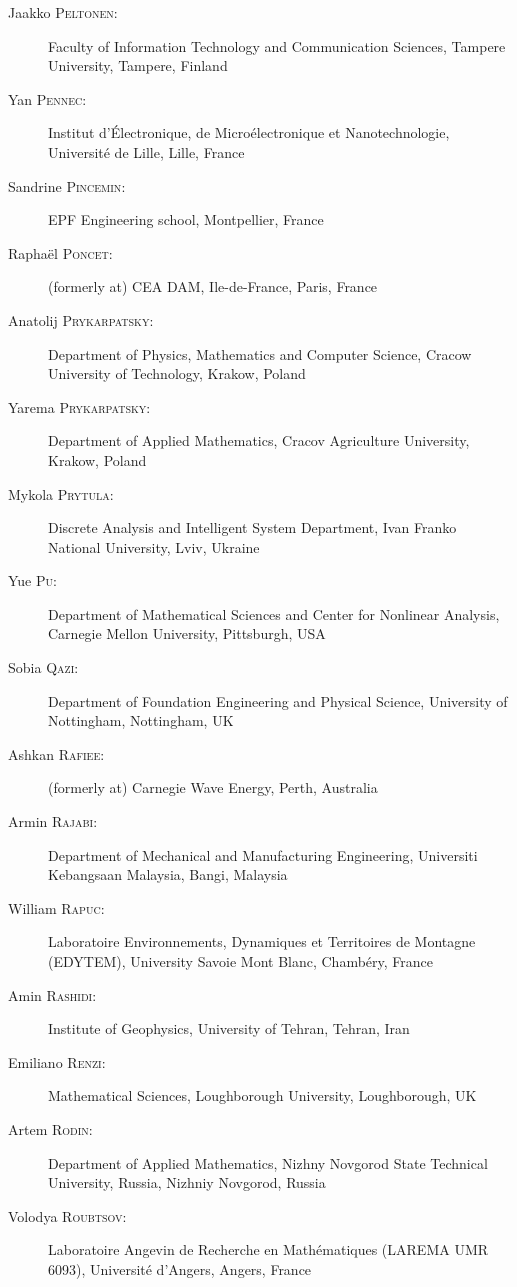 \documentclass[final, a4paper, oneside, 12pt]{article}
\numberwithin{equation}{section}
\begin{document}
\begin{description}
  \item[Jaakko \textsc{Peltonen}:] Faculty of Information Technology and Communication Sciences, Tampere University, Tampere, Finland
  \item[Yan \textsc{Pennec}:] Institut d'\'Electronique, de Micro\'electronique et Nanotechnologie, Universit\'e de Lille, Lille, France
  \item[Sandrine \textsc{Pincemin}:] EPF Engineering school, Montpellier, France
  \item[Rapha\"el \textsc{Poncet}:] (formerly at) CEA DAM, Ile-de-France, Paris, France
  \item[Anatolij \textsc{Prykarpatsky}:] Department of Physics, Mathematics and Computer Science, Cracow University of Technology, Krakow, Poland
  \item[Yarema \textsc{Prykarpatsky}:] Department of Applied Mathematics, Cracov Agriculture University, Krakow, Poland
  \item[Mykola \textsc{Prytula}:] Discrete Analysis and Intelligent System Department, Ivan Franko National University, Lviv, Ukraine
  \item[Yue \textsc{Pu}:] Department of Mathematical Sciences and Center for Nonlinear Analysis, Carnegie Mellon University, Pittsburgh, USA
  \item[Sobia \textsc{Qazi}:] Department of Foundation Engineering and Physical Science, University of Nottingham, Nottingham, UK
  \item[Ashkan \textsc{Rafiee}:] (formerly at) Carnegie Wave Energy, Perth, Australia
  \item[Armin \textsc{Rajabi}:] Department of Mechanical and Manufacturing Engineering, Universiti Kebangsaan Malaysia, Bangi, Malaysia
  \item[William \textsc{Rapuc}:] Laboratoire Environnements, Dynamiques et Territoires de Montagne (EDYTEM), University Savoie Mont Blanc, Chamb\'ery, France
  \item[Amin \textsc{Rashidi}:] Institute of Geophysics, University of Tehran, Tehran, Iran
  \item[Emiliano \textsc{Renzi}:] Mathematical Sciences, Loughborough University, Loughborough, UK
  \item[Artem \textsc{Rodin}:] Department of Applied Mathematics, Nizhny Novgorod State Technical University, Russia, Nizhniy Novgorod, Russia
  \item[Volodya \textsc{Roubtsov}:] Laboratoire Angevin de Recherche en Math\'ematiques (LAREMA UMR 6093), Universit\'e d'Angers, Angers, France

\end{description}
\end{document}
